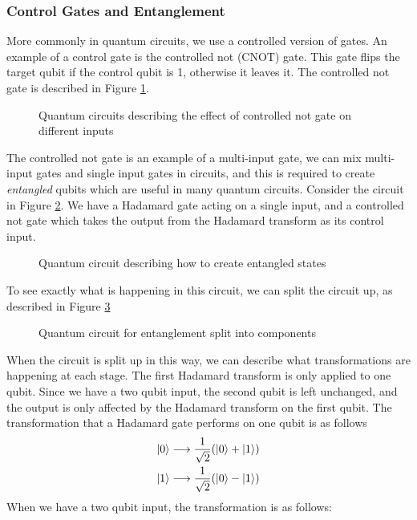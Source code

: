 \subsubsection{Control Gates and Entanglement}
More commonly in quantum circuits, we use a controlled version of gates. An example of a control gate is the controlled not (CNOT) gate. This gate flips the target qubit if the control qubit is 1, otherwise it leaves it. The controlled not gate is described in Figure \ref{fig:cnotGate}.
\begin{figure}[!htb]
\centering
\resizebox{5cm}{!}{}
\caption{Quantum circuits describing the effect of controlled not gate on different inputs}
\label{fig:cnotGate}
\end{figure}
The controlled not gate is an example of a multi-input gate, we can mix multi-input gates and single input gates in circuits, and this is required to create \emph{entangled} qubits which are useful in many quantum circuits. Consider the circuit in Figure \ref{fig:entangle}. We have a Hadamard gate acting on a single input, and a controlled not gate which takes the output from the Hadamard transform as its control input.
\begin{figure}[!htb]
\centering
\resizebox{3cm}{!}{}
\caption{Quantum circuit describing how to create entangled states}
\label{fig:entangle}
\end{figure}
To see exactly what is happening in this circuit, we can split the circuit up, as described in Figure \ref{fig:splitEntangle} 
\begin{figure}[!htb]
\centering
\resizebox{5cm}{!}{}
\caption{Quantum circuit for entanglement split into components}
\label{fig:splitEntangle}
\end{figure}
When the circuit is split up in this way, we can describe what transformations are happening at each stage. The first Hadamard transform is only applied to one qubit. Since we have a two qubit input, the second qubit is left unchanged, and the output is only affected by the Hadamard transform on the first qubit. The transformation that a Hadamard gate performs on one qubit is as follows \begin{align*}
    \ket{0} \longrightarrow \frac{1}{\sqrt{2}}(\ket{0} + \ket{1})\\
    \ket{1} \longrightarrow \frac{1}{\sqrt{2}}(\ket{0} - \ket{1})
\end{align*}
When we have a two qubit input, the transformation is as follows:
